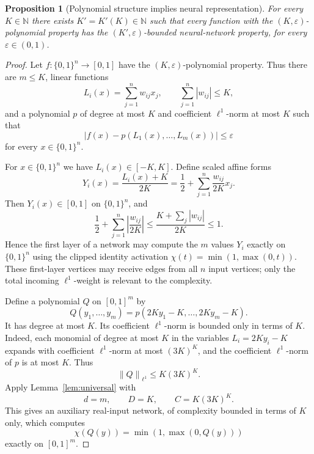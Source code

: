 \documentclass[11pt]{amsart}
\newtheorem{proposition}[theorem]{Proposition}
\newcommand{\N}{\mathbb N}
\newcommand{\1}{\mathbf 1}
\newcommand{\cube}{\{0,1\}}
\newcommand{\norm}[1]{\left\lVert #1\right\rVert}
\begin{document}
\begin{proposition}[Polynomial structure implies neural representation]\label{prop:poly-nn}
For every \(K\in\N\) there exists \(K'=K'(K)\in\N\) such that every function
with the \((K,\varepsilon)\)-polynomial property has the
\((K',\varepsilon)\)-bounded neural-network property, for every
\(\varepsilon\in(0,1)\).
\end{proposition}

\begin{proof}
Let $f:\cube^n\to[0,1]$ have the $(K,\varepsilon)$-polynomial property.  Thus there are $m\leq K$, linear functions
\[
        L_i(x)=\sum_{j=1}^n w_{ij}x_j,\qquad
        \sum_{j=1}^n |w_{ij}|\leq K,
\]
and a polynomial $p$ of degree at most $K$ and coefficient $\ell^1$-norm at most $K$ such that
\[
        |f(x)-p(L_1(x),\ldots,L_m(x))|\leq\varepsilon
\]
for every $x\in\cube^n$.

For $x\in\cube^n$ we have $L_i(x)\in[-K,K]$.  Define scaled affine forms
\[
        Y_i(x)=\frac{L_i(x)+K}{2K}
        =
        \frac{1}{2}+\sum_{j=1}^n \frac{w_{ij}}{2K}x_j .
\]
Then $Y_i(x)\in[0,1]$ on $\cube^n$, and
\[
        \frac{1}{2}+\sum_{j=1}^n\left|\frac{w_{ij}}{2K}\right|
        \leq
        \frac{K+\sum_j |w_{ij}|}{2K}\leq1.
\]
Hence the first layer of a network may compute the $m$ values $Y_i$ exactly on $\cube^n$ using the clipped identity activation $\chi(t)=\min(1,\max(0,t))$.  These first-layer vertices may receive edges from all \(n\) input vertices; only the total incoming \(\ell^1\)-weight is relevant to the complexity.

Define a polynomial $Q$ on $[0,1]^m$ by
\[
        Q(y_1,\ldots,y_m)
        =
        p(2Ky_1-K,\ldots,2Ky_m-K).
\]
It has degree at most $K$.  Its coefficient $\ell^1$-norm is bounded only in terms of $K$. Indeed, each monomial of degree at most $K$ in the variables $L_i=2Ky_i-K$ expands with coefficient $\ell^1$-norm at most $(3K)^K$, and the coefficient $\ell^1$-norm of $p$ is at most $K$.  Thus
\[
        \norm{Q}_{\ell^1}\leq K(3K)^K .
\]
Apply Lemma~\ref{lem:universal} with
\[
        d=m,\qquad D=K,\qquad C=K(3K)^K .
\]
This gives an auxiliary real-input network, of complexity bounded in terms of $K$ only, which computes
\[
        \chi(Q(y))=\min(1,\max(0,Q(y)))
\]
exactly on \([0,1]^m\).


\end{proof}
\end{document}

